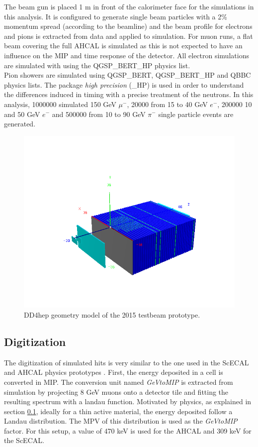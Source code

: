 The beam gun is placed 1 m in front of the calorimeter face for the simulations in this analysis. It is configured to generate single beam particles with a 2\% momentum spread (according to the beamline) and the beam profile for electrons and pions is extracted from data and applied to simulation. For muon runs, a flat beam covering the full AHCAL is simulated as this is not expected to have an influence on the MIP and time response of the detector. All electron simulations are simulated with  using the QGSP\_BERT\_HP physics list.\\

Pion showers are simulated using QGSP\_BERT, QGSP\_BERT\_HP and QBBC physics lists. The package \textit{high precision} (\_HP) is used in order to understand the differences induced in timing with a precise treatment of the neutrons. In this analysis, 1000000 simulated 150 GeV $\mu^-$, 20000 from 15 to 40 GeV $e^-$, 200000 10 and 50 GeV $e^-$ and 500000 from 10 to 90 GeV $\pi^-$ single particle events are generated.

\begin{figure}[htbp!]
  \centering
  \includegraphics[width=0.7\linewidth]{chap4/fig/DD4hep_AHCALModel.png}
  \caption{DD4hep geometry model of the 2015 testbeam prototype.} \label{fig:GeomModel}
\end{figure}

\subsection{Digitization}

The digitization of simulated hits is very similar to the one used in the ScECAL and AHCAL physics prototypes \cite{2011_JINST_6_P04003}. First, the energy deposited in a cell is converted in MIP. The conversion unit named \textit{GeVtoMIP} is extracted from simulation by projecting 8 GeV muons onto a detector tile and fitting the resulting spectrum with a landau function. Motivated by physics, as explained in section \ref{}, ideally for a thin active material, the energy deposited follow a Landau distribution. The MPV of this distribution is used as the \textit{GeVtoMIP} factor. For this setup, a value of 470 keV is used for the AHCAL and 309 keV for the ScECAL.\\

